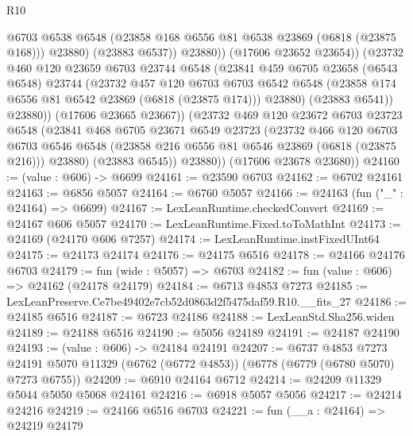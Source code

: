 \begin{lexlean}{R10}
\begin{coremodule}
                      @6703
                      @6538
                      @6548
                      (@23858 @168 @6556 @81 @6538 @23869 (@6818 (@23875 @168)))
                      @23880)
                    (@23883 @6537))
                  @23880))
              (@17606 @23652 @23654))
            (@23732
              @460
              @120
              @23659
              @6703
              @23744
              @6548
              (@23841
                @459
                @6705
                @23658
                (@6543 @6548)
                @23744
                (@23732
                  @457
                  @120
                  @6703
                  @6703
                  @6542
                  @6548
                  (@23858 @174 @6556 @81 @6542 @23869 (@6818 (@23875 @174)))
                  @23880)
                (@23883 @6541))
              @23880))
          (@17606 @23665 @23667))
        (@23732
          @469
          @120
          @23672
          @6703
          @23723
          @6548
          (@23841
            @468
            @6705
            @23671
            @6549
            @23723
            (@23732
              @466
              @120
              @6703
              @6703
              @6546
              @6548
              (@23858 @216 @6556 @81 @6546 @23869 (@6818 (@23875 @216)))
              @23880)
            (@23883 @6545))
          @23880))
      (@17606 @23678 @23680))
@24160 := (value : @606) -> @6699
@24161 := @23590 @6703
@24162 := @6702 @24161
@24163 := @6856 @5057
@24164 := @6760 @5057
@24166 := @24163 (fun ("_" : @24164) => @6699)
@24167 := LexLeanRuntime.checkedConvert
@24169 := @24167 @606 @5057
@24170 := LexLeanRuntime.Fixed.toToMathInt
@24173 := @24169 (@24170 @606 @7257)
@24174 := LexLeanRuntime.instFixedUInt64
@24175 := @24173 @24174
@24176 := @24175 @6516
@24178 := @24166 @24176 @6703
@24179 := fun (wide : @5057) => @6703
@24182 := fun (value : @606) => @24162 (@24178 @24179)
@24184 := @6713 @4853 @7273
@24185 := LexLeanPreserve.Ce7be49402e7cb52d0863d2f5475daf59.R10.__fits_27
@24186 := @24185 @6516
@24187 := @6723 @24186
@24188 := LexLeanStd.Sha256.widen
@24189 := @24188 @6516
@24190 := @5056 @24189
@24191 := @24187 @24190
@24193 := (value : @606) -> @24184 @24191
@24207 := @6737
    @4853
    @7273
    @24191
    @5070
    @11329
    (@6762 (@6772 @4853))
    (@6778 (@6779 (@6780 @5070) @7273 @6755))
@24209 := @6910 @24164 @6712
@24214 := @24209 @11329 @5044 @5050 @5068 @24161
@24216 := @6918 @5057 @5056
@24217 := @24214 @24216
@24219 := @24166 @6516 @6703
@24221 := fun (__a : @24164) => @24219 @24179

\end{coremodule}
\end{lexlean}
